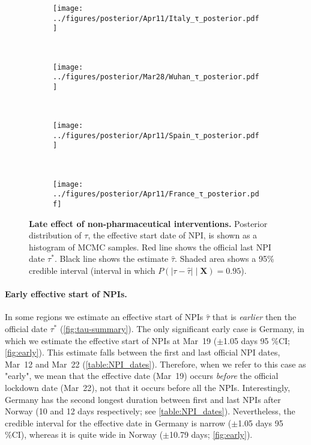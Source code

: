 \documentclass[12pt]{extarticle}
\let\vec\mathbf
\begin{document}
\begin{figure}[h]
    \centering
    \begin{subfigure}{0.45\textwidth}
        \texttt{[image: ../figures/posterior/Apr11/Italy\_τ\_posterior.pdf]}
    \end{subfigure}
  	~
    \begin{subfigure}{0.45\textwidth}
        \texttt{[image: ../figures/posterior/Mar28/Wuhan\_τ\_posterior.pdf]}
    \end{subfigure}
    \\
    \begin{subfigure}{0.45\textwidth}
        \texttt{[image: ../figures/posterior/Apr11/Spain\_τ\_posterior.pdf]}
    \end{subfigure}
    ~
    \begin{subfigure}{0.45\textwidth}
		\texttt{[image: ../figures/posterior/Apr11/France\_τ\_posterior.pdf]}
    \end{subfigure}
    \caption{
	\textbf{Late effect of non-pharmaceutical interventions.}
    Posterior distribution of $\tau$, the effective start date of NPI, is shown as a histogram of MCMC samples. Red line shows the official last NPI date $\tau^*$. Black line shows the estimate $\hat{\tau}$. Shaded area shows a 95\% credible interval (interval in which $P(|\tau - \hat{\tau}| \mid \vec{X}) = 0.95$). 
    }
    \label{fig:late}
\end{figure}



\paragraph*{Early effective start of NPIs.}
In some regions we estimate an effective start of NPIs $\hat{\tau}$ that is \emph{earlier} then the official date $\tau^*$ (\autoref{fig:tau-summary}).
The only significant early case is Germany, in which we estimate the effective start of NPIs at Mar~19 ($\pm$1.05 days 95 \%CI; \autoref{fig:early}).
This estimate falls between the first and last official NPI dates, Mar~12 and Mar~22 (\autoref{table:NPI_dates}). Therefore, when we refer to this case as "early", we mean that the effective date (Mar~19) occurs \emph{before} the official lockdown date (Mar~22), not that it occurs before all the NPIs.
Interestingly, Germany has the second longest duration between first and last NPIs after Norway (10 and 12 days respectively; see \autoref{table:NPI_dates}).
Nevertheless, the credible interval for the effective date in Germany is narrow ($\pm$1.05 days 95 \%CI), whereas it is quite wide in Norway ($\pm$10.79 days; \autoref{fig:early}).
\end{document}
